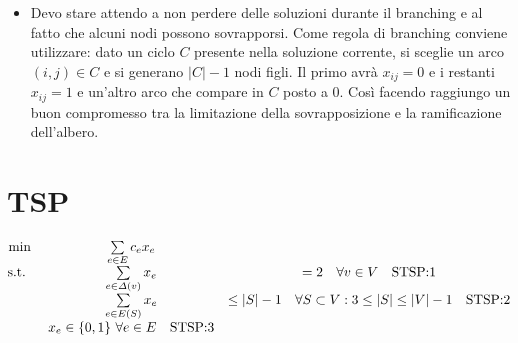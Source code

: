 \begin{itemize}
	\item Devo stare attendo a non perdere delle soluzioni durante il branching e al fatto che alcuni nodi possono sovrapporsi. 
	Come regola di branching conviene utilizzare: dato un ciclo $C$ presente nella soluzione corrente, si sceglie un arco $(i,j) \in C$ e si generano $|C| - 1 $ nodi figli. Il primo avrà $x_{ij} = 0$ e i restanti $x_{ij} =1$ e un'altro arco che compare in $C$ posto a 0. Così facendo raggiungo un buon compromesso tra la limitazione della sovrapposizione e la ramificazione dell'albero.
\end{itemize}

\section{TSP}

$$
\begin{matrix}
\min \: & \sum\limits_{e \in E} c_ex_e &\\
\text{s.t. } \:  & \sum\limits_{e \in \varDelta(v) } x_e &=2 \quad \forall v \in V \quad \text{STSP:1} \\
        & \sum\limits_{e \in E(S)} x_e & \leq  |S| -1 \quad \forall S \subset V : 3 \leq |S| \leq |V| - 1 \quad \text{STSP:2} \\
        & x_e \in \{0,1\}\  \forall e \in E \quad \text{STSP:3}
\end{matrix}
$$

